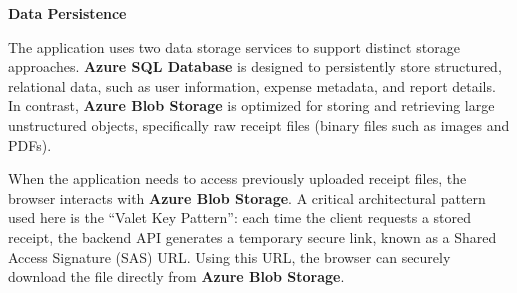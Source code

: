\vspace{0.5cm}

\textbf{Data Persistence}

The application uses two data storage services to support distinct storage approaches. \textbf{Azure SQL Database} is designed to persistently store structured, relational data, such as user information, expense metadata, and report details. In contrast, \textbf{Azure Blob Storage} is optimized for storing and retrieving large unstructured objects, specifically raw receipt files (binary files such as images and PDFs).

When the application needs to access previously uploaded receipt files, the browser interacts with \textbf{Azure Blob Storage}. A critical architectural pattern used here is the ``Valet Key Pattern'': each time the client requests a stored receipt, the backend API generates a temporary secure link, known as a Shared Access Signature (SAS) URL. Using this URL, the browser can securely download the file directly from \textbf{Azure Blob Storage}.
